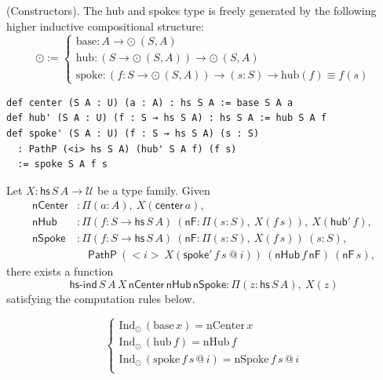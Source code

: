 \documentclass{article}
\begin{document}
\begin{definition} (Constructors).
The hub and spokes type is freely generated by the following higher inductive compositional structure:
\[
\odot :=
\begin{cases}
\text{base} : A \to \odot\ (S,A) \\
\text{hub} : (S \to \odot\ (S,A)) \to \odot\ (S,A) \\
\text{spoke} : (f : S \to \odot\ (S,A)) \to (s : S) \to \text{hub}(f) \equiv f(s)
\end{cases}
\]


\begin{lstlisting}[mathescape=true]
def center (S A : U) (a : A) : hs S A := base S A a
def hub' (S A : U) (f : S → hs S A) : hs S A := hub S A f
def spoke' (S A : U) (f : S → hs S A) (s : S)
  : PathP (<i> hs S A) (hub' S A f) (f s)
  := spoke S A f s
\end{lstlisting}
\end{definition}

\begin{theorem}[Elimination]
Let \(X : \mathsf{hs}\, S\, A \to \mathcal{U}\) be a type family. Given
\begin{align*}
  \mathsf{nCenter} & : \Pi (a : A),\ X(\mathsf{center}\, a), \\
  \mathsf{nHub}    & : \Pi (f : S \to \mathsf{hs}\, S\, A)\ 
                     (\mathsf{nF} : \Pi (s : S),\ X(f\, s)),\ 
                     X(\mathsf{hub}'\, f), \\
  \mathsf{nSpoke}  & : \Pi (f : S \to \mathsf{hs}\, S\, A)\ (\mathsf{nF} : \Pi (s : S),\ X(f\, s))\ (s : S), \\
  &\quad \mathsf{PathP}\ (<i>\ X(\mathsf{spoke}'\, f\, s\ @\ i))\ (\mathsf{nHub}\, f\, \mathsf{nF})\ (\mathsf{nF}\, s),
\end{align*}
there exists a function
\[
\mathsf{hs\text{-}ind}\, S\, A\, X\, \mathsf{nCenter}\, \mathsf{nHub}\, \mathsf{nSpoke} : \Pi (z : \mathsf{hs}\, S\, A),\ X(z)
\]
satisfying the computation rules below.

\[
\begin{cases}
\text{Ind}_\odot \, (\text{base} \, x) = \text{nCenter} \, x \\
\text{Ind}_\odot \, (\text{hub} \, f) = \text{nHub} \, f \\
\text{Ind}_\odot \, (\text{spoke} \, f \, s \, @ \, i) = \text{nSpoke} \, f \, s \, @ \, i \\
\end{cases}
\]
\end{theorem}
\end{document}
